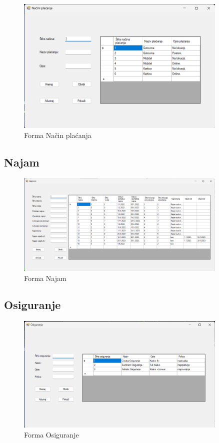 \documentclass[]{foi}
\begin{document}
\begin{figure}[!ht]
    \centering
    \includegraphics[width=0.9\textwidth]{slike/nacin.png}
    \caption{Forma Način plaćanja}
    \label{fig:nacin}
\end{figure}

\subsection{Najam}
\label{sec:najam}

\begin{figure}[!ht]
    \centering
    \includegraphics[width=0.9\textwidth]{slike/najam.png}
    \caption{Forma Najam}
    \label{fig:najam}
\end{figure}
\newpage

\subsection{Osiguranje}

\begin{figure}[!ht]
    \centering
    \includegraphics[width=0.9\textwidth]{slike/osiguranje.png}
    \caption{Forma Osiguranje}
    \label{fig:osiguranje}
\end{figure}
\end{document}
